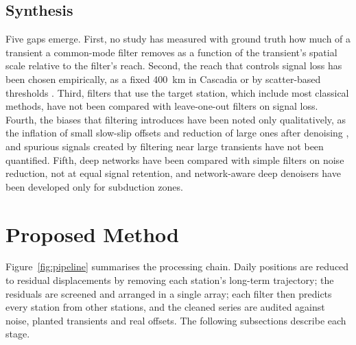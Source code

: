 \documentclass[11pt,a4paper]{article}
\begin{document}
\subsection{Synthesis}

Five gaps emerge. First, no study has measured with ground truth how much of a transient a common-mode filter removes as a function of the transient's spatial scale relative to the filter's reach. Second, the reach that controls signal loss has been chosen empirically, as a fixed 400~km in Cascadia \citep{bachelot2025} or by scatter-based thresholds \citep{tianshen2016}. Third, filters that use the target station, which include most classical methods, have not been compared with leave-one-out filters on signal loss. Fourth, the biases that filtering introduces have been noted only qualitatively, as the inflation of small slow-slip offsets and reduction of large ones after denoising \citep{bachelot2025}, and spurious signals created by filtering near large transients have not been quantified. Fifth, deep networks have been compared with simple filters on noise reduction, not at equal signal retention, and network-aware deep denoisers have been developed only for subduction zones.

\section{Proposed Method}

Figure~\ref{fig:pipeline} summarises the processing chain. Daily positions are reduced to residual displacements by removing each station's long-term trajectory; the residuals are screened and arranged in a single array; each filter then predicts every station from other stations, and the cleaned series are audited against noise, planted transients and real offsets. The following subsections describe each stage.
\end{document}
